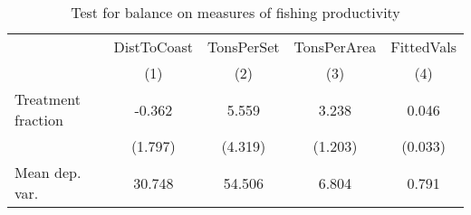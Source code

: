 \begin{table}[tb]
\centering
\caption{Test for balance on measures of fishing productivity} 
\label{balance}
\begin{tabular}{lcccc}
   \toprule   & DistToCoast & TonsPerSet & TonsPerArea & FittedVals \\ 
   & (1) & (2) & (3) & (4) \\ 
   \midrule Treatment fraction & -0.362 & 5.559 & 3.238 & 0.046 \\ 
   & (1.797) & (4.319) & (1.203) & (0.033) \\ 
   \midrule Mean dep. var. & 30.748 & 54.506 & 6.804 & 0.791 \\ 
   \bottomrule  \end{tabular}
\end{table}
